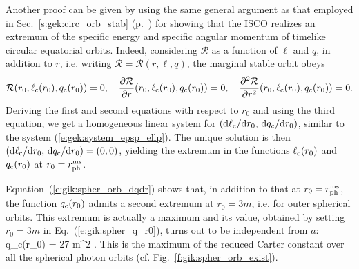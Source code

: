 \begin{remark}
Another proof can be given by using the same general argument as that employed in
Sec.~\ref{s:gek:circ_orb_stab} (p.~\pageref{p:gek:ISCO_extremum_eps_ell})
for showing that the ISCO realizes an extremum of the specific energy
and specific angular momentum of timelike circular equatorial orbits.
Indeed, considering $\mathcal{R}$ as a function of $\ell$ and $q$, in addition
to $r$, i.e. writing $\mathcal{R} = \mathcal{R}(r, \ell, q)$, the marginal
stable orbit obeys
\[
    \mathcal{R}(r_0, \ell_{\rm c}(r_0), q_{\rm c}(r_0)) = 0,\quad
    \frac{\partial \mathcal{R}}{\partial r}(r_0, \ell_{\rm c}(r_0), q_{\rm c}(r_0)) = 0,\quad
    \frac{\partial^2\mathcal{R}}{\partial r^2} (r_0, \ell_{\rm c}(r_0), q_{\rm c}(r_0)) = 0 .
\]
Deriving the first and second equations with respect to $r_0$
and using the third equation, we get a homogeneous linear
system for $(\mathrm{d}\ell_{\rm c}/\mathrm{d} r_0,\, \mathrm{d} q_{\rm c}/\mathrm{d} r_0)$, similar to the
system (\ref{e:gek:system_epsp_ellp}). The unique solution
is then $(\mathrm{d}\ell_{\rm c}/\mathrm{d} r_0,\, \mathrm{d} q_{\rm c}/\mathrm{d} r_0) = (0, 0)$, yielding the extremum in the
functions $\ell_{\rm c}(r_0)$ and $q_{\rm c}(r_0)$ at $r_0 = r_{\rm ph}^{\rm ms}$.
\end{remark}

Equation~(\ref{e:gik:spher_orb_dqdr}) shows that, in addition to that
at $r_0 = r_{\rm ph}^{\rm ms}$, the function $q_{\rm c}(r_0)$ admits
a second extremum at $r_0 = 3m$, i.e. for outer spherical orbits.
This extremum is actually a maximum and its value, obtained by
setting $r_0 = 3 m$ in Eq.~(\ref{e:gik:spher_q_r0}),
turns out to be independent from $a$:
\be \label{e:gik:spher_max_q}
    \max q_{\rm c}(r_0) = 27 m^2 .
\ee
This is the maximum of the reduced Carter constant over all the spherical photon
orbits (cf. Fig.~\ref{f:gik:spher_orb_exist}).


